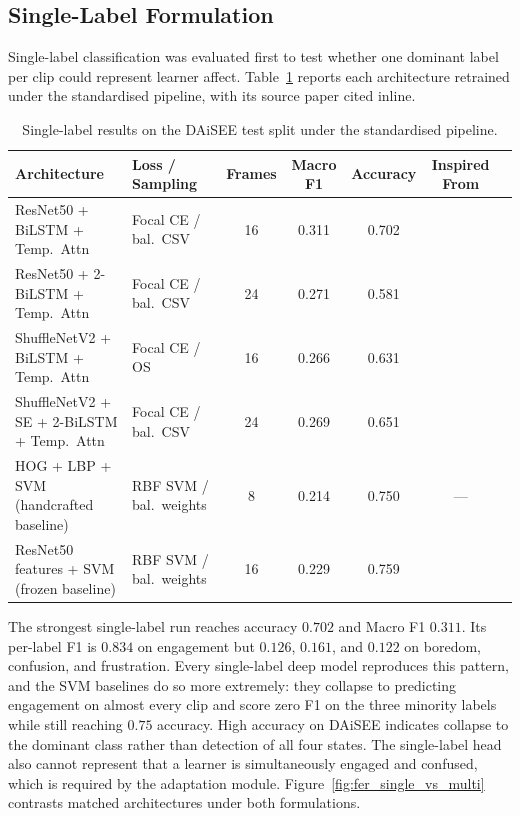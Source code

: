 \subsection{Single-Label Formulation}\label{sec:results_fer_singlelabel}

Single-label classification was evaluated first to test whether one
dominant label per clip could represent learner affect.
Table~\ref{tab:fer_singlelabel_results} reports each architecture
retrained under the standardised pipeline, with its source paper
cited inline.

\begin{table}[H]
\centering
\footnotesize
\caption{Single-label results on the \ac{DAiSEE} test split under the
standardised pipeline.}
\label{tab:fer_singlelabel_results}
\setlength{\tabcolsep}{4pt}
\begin{tabular}{p{4.8cm}lccccl}
\toprule
\textbf{Architecture} & \textbf{Loss / Sampling} & \textbf{Frames} &
\textbf{Macro F1} & \textbf{Accuracy} & \textbf{Inspired From} \\
\midrule
ResNet50 + \ac{BiLSTM} + Temp.\ Attn          & Focal CE / bal.\ CSV    & 16 & 0.311 & 0.702 & \cite{asaju_adaptive_2022,asaju_affects_2021} \\
ResNet50 + 2-\ac{BiLSTM} + Temp.\ Attn        & Focal CE / bal.\ CSV    & 24 & 0.271 & 0.581 & \cite{asaju_adaptive_2022} \\
ShuffleNetV2 + \ac{BiLSTM} + Temp.\ Attn      & Focal CE / OS           & 16 & 0.266 & 0.631 & \cite{aly_revolutionizing_2025} \\
ShuffleNetV2 + \ac{SE} + 2-\ac{BiLSTM} + Temp.\ Attn & Focal CE / bal.\ CSV  & 24 & 0.269 & 0.651 & \cite{aly_revolutionizing_2025} \\
\ac{HOG} + \ac{LBP} + \ac{SVM} (handcrafted baseline)   & RBF \ac{SVM} / bal.\ weights & 8  & 0.214 & 0.750 & --- \\
ResNet50 features + \ac{SVM} (frozen baseline) & RBF \ac{SVM} / bal.\ weights & 16 & 0.229 & 0.759 & \cite{he_resnet_2016} \\
\bottomrule
\end{tabular}
\end{table}

The strongest single-label run reaches accuracy $0.702$ and Macro
F1 $0.311$. Its per-label F1 is $0.834$ on engagement but $0.126$,
$0.161$, and $0.122$ on boredom, confusion, and frustration. Every
single-label deep model reproduces this pattern, and the \ac{SVM}
baselines do so more extremely: they collapse to predicting
engagement on almost every clip and score zero F1 on the three
minority labels while still reaching $0.75$ accuracy. High
accuracy on \ac{DAiSEE} indicates collapse to the dominant class rather
than detection of all four states. The single-label head also
cannot represent that a learner is simultaneously engaged and
confused, which is required by the adaptation module.
Figure~\ref{fig:fer_single_vs_multi} contrasts matched
architectures under both formulations.

